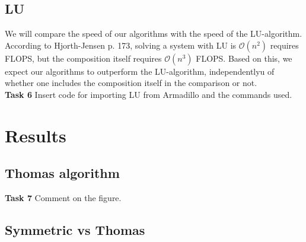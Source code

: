 \documentclass{article}
\begin{document}
\subsection{LU}
We will compare the speed of our algorithms with the speed of the LU-algorithm. According to Hjorth-Jensen \cite{MHJ} p. 173, solving a system with LU is $\mathcal{O}(n^2)$ requires FLOPS, but the composition itself requires  $\mathcal{O}(n^3)$ FLOPS. Based on this, we expect our algorithms to outperform the LU-algorithm, independentlyu of whether one includes the composition itself in the comparison or not.\\

\textbf{Task 6} Insert code for importing LU from Armadillo and the commands used.

\section{Results}

\subsection{Thomas algorithm}
\textbf{Task 7} Comment on the figure.


\subsection{Symmetric vs Thomas}


%	
%	
\end{document}
